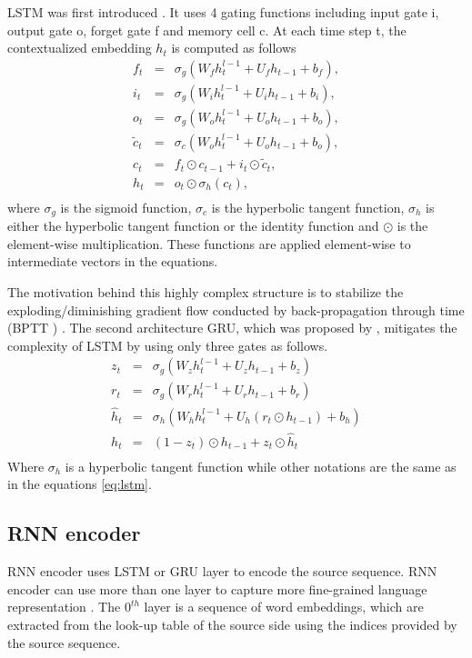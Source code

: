 LSTM was first introduced \cite{Hochreiter97long}. It uses 4 gating functions including input gate i, output gate o, forget gate f and memory cell c. At each time step t, the contextualized embedding $h_t$ is computed as follows
\begin{equation}
\label{eq:lstm}
\begin{array}{rcl}
f_t &=& \sigma_g (W_f h^{l-1}_t + U_f h_{t-1} + b_f),\\
i_t &=& \sigma_g (W_i h^{l-1}_t + U_i h_{t-1} + b_i),\\
o_t &=& \sigma_g (W_o h^{l-1}_t + U_o h_{t-1} + b_o),\\
\tilde{c}_t &=& \sigma_c (W_o h^{l-1}_t + U_o h_{t-1} + b_o),\\
c_t &=& f_t \odot c_{t-1} + i_t \odot \tilde{c}_t,\\
h_t &=& o_t \odot \sigma_h(c_t),\\
\end{array}
\end{equation}
where $\sigma_g$ is the sigmoid function, $\sigma_c$ is the hyperbolic tangent function, $\sigma_h$ is either the hyperbolic tangent function or the identity function and $\odot$ is the element-wise multiplication. These functions are applied element-wise to intermediate vectors in the equations.

The motivation behind this highly complex structure is to stabilize the exploding/diminishing gradient flow \citep{Pascanu13onthe} conducted by back-propagation through time (BPTT ) \cite{Hochreiter97long}. The second architecture GRU, which was proposed by \cite{Cho14properties}, mitigates the complexity of LSTM by using only three gates as follows.
\begin{equation}
\label{eq:gru}
\begin{array}{rcl}
z_t &=& \sigma_g (W_z h^{l-1}_t + U_z h_{t-1} + b_z)\\
r_t &=& \sigma_g (W_r h^{l-1}_t + U_r h_{t-1} + b_r)\\
\hat{h}_t &=& \sigma_h (W_h h^{l-1}_t + U_h (r_t \odot h_{t-1}) + b_h)\\
h_t &=& (1-z_t)\odot h_{t-1} + z_t \odot \hat{h}_t\\
\end{array}
\end{equation}
Where $\sigma_h$ is a hyperbolic tangent function while other notations are the same as in the equations \ref{eq:lstm}.
\subsection{RNN encoder}
RNN encoder uses LSTM or GRU layer to encode the source sequence. RNN encoder can use more than one layer to capture more fine-grained language representation \citep{Li20shallow}. The $0^{th}$ layer is a sequence of word embeddings, which are extracted from the look-up table of the source side using the indices provided by the source sequence. 

